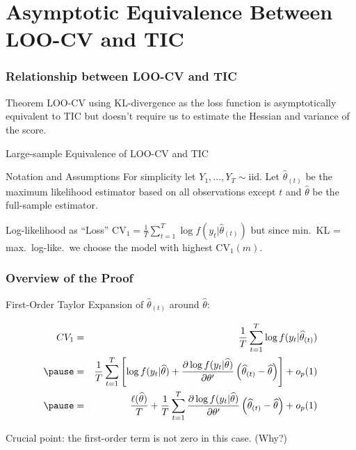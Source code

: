 \section{Asymptotic Equivalence Between LOO-CV and TIC}
\begin{frame}
  \frametitle{Relationship between LOO-CV and TIC}
  \begin{block}{Theorem}
  LOO-CV using KL-divergence as the loss function is asymptotically equivalent to TIC but doesn't require us to estimate the Hessian and variance of the score. 
  \end{block}
\end{frame}
\begin{frame}{Large-sample Equivalence of LOO-CV and TIC}
  
  \begin{block}{Notation and Assumptions}
    For simplicity let $Y_1, \dots, Y_T \sim \text{iid}$.
    Let $\widehat{\theta}_{(t)}$ be the maximum likelihood estimator based on all observations \alert{except $t$} and $\widehat{\theta}$ be the full-sample estimator.
  \end{block}

  \pause

  \begin{block}{Log-likelihood as ``Loss''}
    $\text{CV}_1 = \frac{1}{T} \sum_{t=1}^T \log f(y_t|\widehat{\theta}_{(t)})$ but since min.\ KL = max.\ log-like.\ we choose the model with \alert{highest} $\text{CV}_1(m)$.
  \end{block}
\end{frame}
\begin{frame}
  \frametitle{Overview of the Proof}
    
    First-Order Taylor Expansion of $\widehat{\theta}_{(t)}$ around $\widehat{\theta}$:

    \vspace{-2em}

	\begin{eqnarray*}
		CV_1 &=& \frac{1}{T} \sum_{t=1}^T \log f(y_t|\widehat{\theta}_{(t)})\\ \pause
			&=&\frac{1}{T} \sum_{t=1}^T \left[\log f(y_t|\widehat{\theta}) + \frac{\partial \log f(y_t|\widehat{\theta})}{\partial \theta'}\left(\widehat{\theta}_{(t)} - \widehat{\theta} \right) \right] + o_p(1)\\ \pause
			&=& \frac{\ell(\widehat{\theta})}{T} + \frac{1}{T}\sum_{t=1}^T \frac{\partial \log f(y_t|\widehat{\theta})}{\partial \theta'}\left(\widehat{\theta}_{(t)} - \widehat{\theta} \right) + o_p(1)
	\end{eqnarray*}

  \alert{Crucial point: the first-order term is not zero in this case. (Why?)} 

\end{frame}

